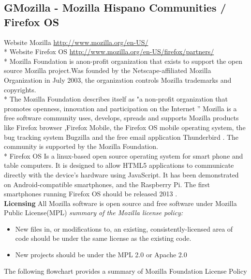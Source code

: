 \documentclass[11pt]{article} %
\begin{document}
\subsection{GMozilla - Mozilla Hispano Communities / Firefox OS} %
Website Mozilla \url {http://www.mozilla.org/en-US/} \\*
Website Firefox OS  \url {http://www.mozilla.org/en-US/firefox/partners/}\\*
Mozilla Foundation is anon-profit organization that exists to support the open source Mozilla project.Was founded by the Netscape-affiliated Mozilla Organization in July 2003, the organization controls Mozilla trademarks and copyrights. \\*
The Mozilla Foundation describes itself as "a non-profit organization that promotes openness, innovation and participation on the Internet ”  
Mozilla is a free software community uses, develops, spreads and supports Mozilla products  like Firefox browser ,Firefox Mobile, the Firefox OS mobile operating system, the bug tracking system Bugzilla and the free email application Thunderbird .
The community is supported by the Mozilla Foundation.\\*
Firefox OS 
Is a linux-based open source operating system for smart phone and table computers. 
It is designed to allow HTML5 applications to communicate directly with the device's hardware using JavaScript. It has been demonstrated on Android-compatible smartphones, and the Raspberry Pi.
The first smartphones running Firefox OS should be released 2013 .\\
{\bf Licensing}
All Mozilla software is open source and free software under Mozilla Public License(MPL)
{\it summary of the Mozilla license policy:}
\begin{itemize}
\item New files in, or modifications to, an existing, consistently-licensed area of code should be under the same license as the existing code.
\item New projects should be under the MPL 2.0 or Apache 2.0 
\end{itemize}
\centerline{ The following flowchart provides a summary of Mozilla Foundation License Policy} 
\end{document}
